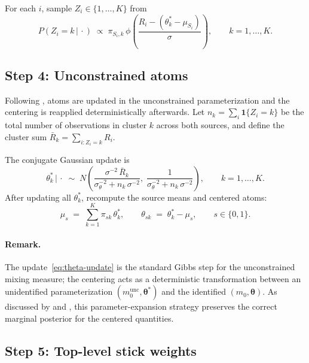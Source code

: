 \documentclass[11pt]{article}
\newcommand{\given}{\,|\,}
\newcommand{\1}{\mathbf{1}}
\begin{document}
For each $i$, sample $Z_i \in \{1, \ldots, K\}$ from
\begin{equation}
P(Z_i = k \given \cdot) \;\propto\; \pi_{S_i, k}\, \phi\!\left(\frac{R_i - (\theta_k^* - \mu_{S_i})}{\sigma}\right), \qquad k = 1, \ldots, K.
\end{equation}

\subsection{Step 4: Unconstrained atoms}

Following \citet{henderson2020individualized}, atoms are updated in the unconstrained parameterization and the centering is reapplied deterministically afterwards. Let $n_k = \sum_i \1\{Z_i = k\}$ be the total number of observations in cluster $k$ across both sources, and define the cluster sum $\bar R_k = \sum_{i : Z_i = k} R_i$.

The conjugate Gaussian update is
\begin{equation}
\theta_k^* \given \cdot \;\sim\; N\!\left(\frac{\sigma^{-2}\, \bar R_k}{\sigma_\theta^{-2} + n_k\, \sigma^{-2}},\; \frac{1}{\sigma_\theta^{-2} + n_k\, \sigma^{-2}}\right), \qquad k = 1, \ldots, K.
\label{eq:theta-update}
\end{equation}
After updating all $\theta_k^*$, recompute the source means and centered atoms:
\begin{equation}
\mu_s \;=\; \sum_{k=1}^K \pi_{sk}\, \theta_k^*, \qquad \theta_{sk} \;=\; \theta_k^* - \mu_s, \qquad s \in \{0, 1\}.
\end{equation}

\paragraph{Remark.} The update~\eqref{eq:theta-update} is the standard Gibbs step for the unconstrained mixing measure; the centering acts as a deterministic transformation between an unidentified parameterization $(m_0^{\mathrm{unc}}, \bm{\theta}^*)$ and the identified $(m_0, \bm{\theta})$. As discussed by \citet{yang2010semiparametric} and \citet{henderson2020individualized}, this parameter-expansion strategy preserves the correct marginal posterior for the centered quantities.

\subsection{Step 5: Top-level stick weights}
\end{document}
